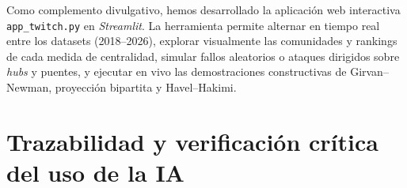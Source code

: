 \documentclass[11pt,a4paper]{article}
\begin{document}
Como complemento divulgativo, hemos desarrollado la aplicación web interactiva \texttt{app\_twitch.py} en \textit{Streamlit}. La herramienta permite alternar en tiempo real entre los datasets (2018--2026), explorar visualmente las comunidades y rankings de cada medida de centralidad, simular fallos aleatorios o ataques dirigidos sobre \textit{hubs} y puentes, y ejecutar en vivo las demostraciones constructivas de Girvan--Newman, proyección bipartita y Havel--Hakimi.

\section{Trazabilidad y verificación crítica del uso de la IA}
\end{document}
